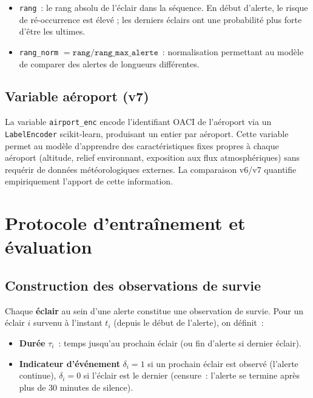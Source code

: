 \documentclass[a4paper,11pt]{article}
\begin{document}
\begin{itemize}[leftmargin=1.8em]
  \item \texttt{rang}~: le rang absolu de l'éclair dans la séquence. En début d'alerte, le
    risque de ré-occurrence est élevé ; les derniers éclairs ont une probabilité plus forte d'être
    les ultimes.
  \item \texttt{rang\_norm} $= \texttt{rang} / \texttt{rang\_max\_alerte}$~: normalisation
    permettant au modèle de comparer des alertes de longueurs différentes.
\end{itemize}

\subsection{Variable aéroport (v7)}

La variable \texttt{airport\_enc} encode l'identifiant OACI de l'aéroport via un
\texttt{LabelEncoder} scikit-learn, produisant un entier par aéroport. Cette variable permet au
modèle d'apprendre des caractéristiques fixes propres à chaque aéroport (altitude, relief
environnant, exposition aux flux atmosphériques) sans requérir de données météorologiques externes.
La comparaison v6/v7 quantifie empiriquement l'apport de cette information.

\section{Protocole d'entraînement et évaluation}

\subsection{Construction des observations de survie}

Chaque \textbf{éclair} au sein d'une alerte constitue une observation de survie. Pour un éclair
$i$ survenu à l'instant $t_i$ (depuis le début de l'alerte), on définit~:

\begin{itemize}[leftmargin=1.8em]
  \item \textbf{Durée} $\tau_i$~: temps jusqu'au prochain éclair (ou fin d'alerte si dernier éclair).
  \item \textbf{Indicateur d'événement} $\delta_i = 1$ si un prochain éclair est observé (l'alerte
    continue), $\delta_i = 0$ si l'éclair est le dernier (censure~: l'alerte se termine après
    plus de 30 minutes de silence).
\end{itemize}
\end{document}
